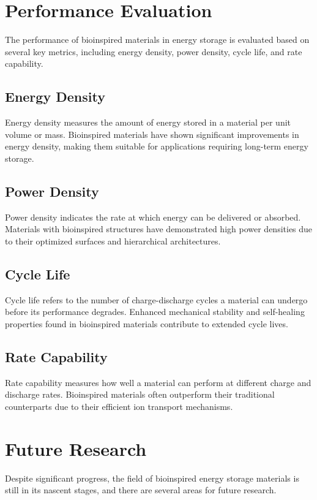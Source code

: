 \documentclass[12pt]{article}
\begin{document}
\section{Performance Evaluation}
The performance of bioinspired materials in energy storage is evaluated based on several key metrics, including energy density, power density, cycle life, and rate capability.

\subsection{Energy Density}
Energy density measures the amount of energy stored in a material per unit volume or mass. Bioinspired materials have shown significant improvements in energy density, making them suitable for applications requiring long-term energy storage\cite{energyDensity}.

\subsection{Power Density}
Power density indicates the rate at which energy can be delivered or absorbed. Materials with bioinspired structures have demonstrated high power densities due to their optimized surfaces and hierarchical architectures\cite{powerDensity}.

\subsection{Cycle Life}
Cycle life refers to the number of charge-discharge cycles a material can undergo before its performance degrades. Enhanced mechanical stability and self-healing properties found in bioinspired materials contribute to extended cycle lives\cite{cycleLife}.

\subsection{Rate Capability}
Rate capability measures how well a material can perform at different charge and discharge rates. Bioinspired materials often outperform their traditional counterparts due to their efficient ion transport mechanisms\cite{rateCapability}.

\section{Future Research}
Despite significant progress, the field of bioinspired energy storage materials is still in its nascent stages, and there are several areas for future research.
\end{document}
